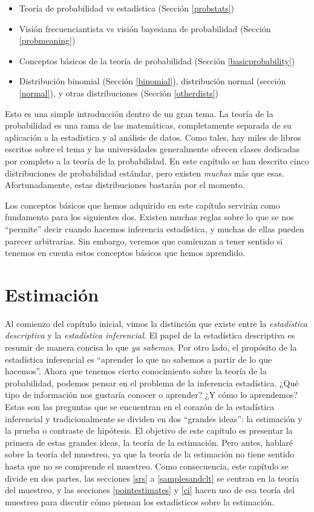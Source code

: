 \documentclass[spanish,]{book}
\providecommand{\tightlist}{%
  \setlength{\itemsep}{0pt}\setlength{\parskip}{0pt}}
\begin{document}
\begin{itemize}
\tightlist
\item
  Teoría de probabilidad vs estadística (Sección \ref{probstats})
\item
  Visión frecuenciantista vs visión bayesiana de probabilidad (Sección
  \ref{probmeaning})
\item
  Conceptos básicos de la teoría de probabilidad (Sección
  \ref{basicprobability})
\item
  Distribución binomial (Sección \ref{binomial}), distribución normal
  (sección \ref{normal}), y otras distribuciones (Sección
  \ref{otherdists})
\end{itemize}

Esto es una simple introducción dentro de un gran tema. La teoría de la
probabilidad es una rama de las matemáticas, completamente separada de
su aplicación a la estadística y al análisis de datos. Como tales, hay
miles de libros escritos sobre el tema y las universidades generalmente
ofrecen clases dedicadas por completo a la teoría de la probabilidad. En
este capítulo se han descrito cinco distribuciones de probabilidad
estándar, pero existen \emph{muchas} más que esas. Afortunadamente,
estas distribuciones bastarán por el momento.

Los conceptos básicos que hemos adquirido en este capítulo servirán como
fundamento para los siguientes dos. Existen muchas reglas sobre lo que
se nos ``permite'' decir cuando hacemos inferencia estadística, y muchas
de ellas pueden parecer arbitrarias. Sin embargo, veremos que comienzan
a tener sentido si tenemos en cuenta estos conceptos básicos que hemos
aprendido.

\chapter{Estimación}\label{estimation}

Al comienzo del capítulo inicial, vimos la distinción que existe entre
la \emph{estadística descriptiva} y la \emph{estadística inferencial}.
El papel de la estadística descriptiva es resumir de manera concisa lo
que \emph{ya sabemos}. Por otro lado, el propósito de la estadística
inferencial es ``aprender lo que no sabemos a partir de lo que
hacemos''. Ahora que tenemos cierto conocimiento sobre la teoría de la
probabilidad, podemos pensar en el problema de la inferencia
estadística. ¿Qué tipo de información nos gustaría conocer o aprender?
¿Y cómo lo aprendemos? Estas son las preguntas que se encuentran en el
corazón de la estadística inferencial y tradicionalmente se dividen en
dos ``grandes ideas'': la estimación y la prueba o contraste de
hipótesis. El objetivo de este capítulo es presentar la primera de estas
grandes ideas, la teoría de la estimación. Pero antes, hablaré sobre la
teoría del muestreo, ya que la teoría de la estimación no tiene sentido
hasta que no se comprende el muestreo. Como consecuencia, este capítulo
se divide en dos partes, las secciones \ref{srs} a \ref{samplesandclt}
se centran en la teoría del muestreo, y las secciones
\ref{pointestimates} y \ref{ci} hacen uso de esa teoría del muestreo
para discutir cómo piensan los estadísticos sobre la estimación.
\end{document}
